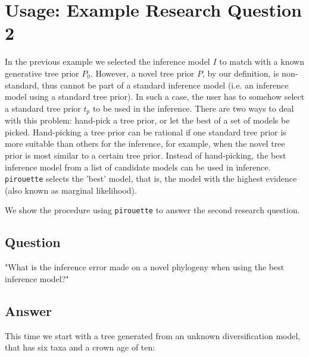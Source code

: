 \documentclass{article}
\begin{document}
\section{Usage: Example Research Question 2}

In the previous example we selected the inference model $\mathit{I}$ to match 
with a known generative tree prior $\mathit{P_{0}}$.
However, a novel tree prior $\mathit{P}$, by our definition, is non-standard, 
thus cannot be part of a standard inference 
model (i.e. an inference model using a standard tree prior).
In such a case, the user has to somehow select 
a standard tree prior $\mathit{t_{p}}$ to be 
used in the inference.
There are two ways to deal with this problem: hand-pick a tree
prior, or let the best of a set of models be picked. 
Hand-picking a tree prior can be rational if one standard tree prior 
is more suitable than others for the inference, for example, when
the novel tree prior is most similar to a certain tree prior.
Instead of hand-picking, the best inference model from a list of candidate 
models can be used in inference.
\verb;pirouette; selects the 'best' model, that is, 
the model with the highest evidence (also known as marginal likelihood). 

We show the procedure using \verb;pirouette; to answer the second research 
question.

\subsection{Question}

"What is the inference error made on a novel phylogeny when
using the best inference model?"

\subsection{Answer}

This time we start with a tree generated from an unknown 
diversification model, that has six taxa and a crown age of ten:
\end{document}
